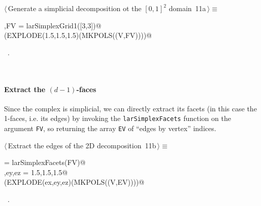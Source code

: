 \documentclass[11pt,oneside]{article}	%
\begin{document}
\begin{flushleft} \small
\begin{minipage}{\linewidth} \label{scrap12}
\protect{}$\langle\,$Generate a simplicial decomposition ot the $[0,1]^2$ domain\nobreak\ {\footnotesize 11a}$\,\rangle\equiv$
\vspace{-1ex}
\begin{list}{}{} \item
\mbox{}\verb@V,FV = larSimplexGrid1([3,3])@\\
\mbox{}\verb@VIEW(EXPLODE(1.5,1.5,1.5)(MKPOLS((V,FV))))@\\
\mbox{}\verb@@{\NWsep}
\end{list}
\vspace{-1ex}
\footnotesize\addtolength{\baselineskip}{-1ex}
\begin{list}{}{\setlength{\itemsep}{-\parsep}\setlength{\itemindent}{-\leftmargin}}
\item \NWtxtMacroRefIn\ .
\end{list}
\end{minipage}\\[4ex]
\end{flushleft}
\paragraph{Extract the $(d-1)$-faces}
Since the complex is simplicial, we can directly extract its facets (in this case the 1-faces, i.e. its edges) by invoking the \texttt{larSimplexFacets} function on the argument \texttt{FV}, so returning the array \texttt{EV} of ``edges by vertex'' indices. 

\begin{flushleft} \small
\begin{minipage}{\linewidth} \label{scrap13}
\protect{}$\langle\,$Extract the edges of the 2D decomposition\nobreak\ {\footnotesize 11b}$\,\rangle\equiv$
\vspace{-1ex}
\begin{list}{}{} \item
\mbox{}\verb@EV = larSimplexFacets(FV)@\\
\mbox{}\verb@ex,ey,ez = 1.5,1.5,1.5@\\
\mbox{}\verb@VIEW(EXPLODE(ex,ey,ez)(MKPOLS((V,EV))))@\\
\mbox{}\verb@@{\NWsep}
\end{list}
\vspace{-1ex}
\footnotesize\addtolength{\baselineskip}{-1ex}
\begin{list}{}{\setlength{\itemsep}{-\parsep}\setlength{\itemindent}{-\leftmargin}}
\item \NWtxtMacroRefIn\ .
\end{list}
\end{minipage}\\[4ex]
\end{flushleft}
\end{document}
